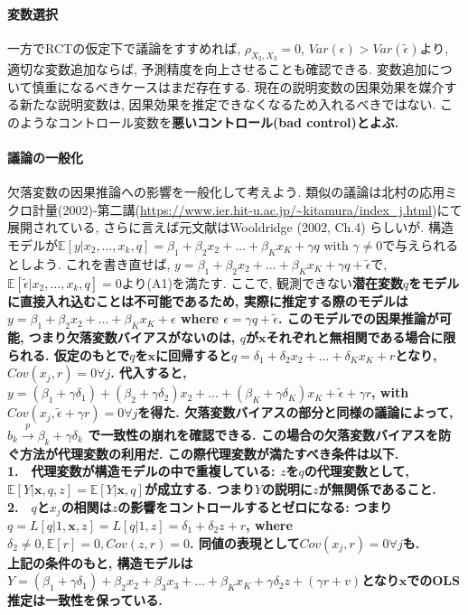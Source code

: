 \documentclass[paper=a4paper,fontsize=10pt]{jlreq}
\begin{document}
\paragraph{変数選択}
一方でRCTの仮定下で議論をすすめれば, $\rho_{X_{2}, X_{3}}=0$, $Var({\epsilon})>Var(\tilde{{\epsilon}})$より, 適切な変数追加ならば, 予測精度を向上させることも確認できる. 変数追加について慎重になるべきケースはまだ存在する. 現在の説明変数の因果効果を媒介する新たな説明変数は, 因果効果を推定できなくなるため入れるべきではない. このようなコントロール変数を\rmfamily\mcfamily\bfseries{悪いコントロール(bad control)}\mdseries とよぶ.\\

\paragraph{議論の一般化}
欠落変数の因果推論への影響を一般化して考えよう. 類似の議論は北村の応用ミクロ計量(2002)-第二講(\url{https://www.ier.hit-u.ac.jp/~kitamura/index_j.html})にて展開されている, さらに言えば元文献はWooldridge (2002, Ch.4) らしいが. 構造モデルが$\mathbb{E}[y|x_2, \dots, x_k, q]=\beta_1+\beta_2x_2+\dots+\beta_Kx_K+\gamma q$ with $\gamma \neq 0$で与えられるとしよう. これを書き直せば, $y=\beta_1+\beta_2x_2+\dots+\beta_Kx_K+\gamma q+\tilde{\epsilon}$で, $\mathbb{E}[\tilde{\epsilon}|x_2, \dots, x_k, q]=0$より(A1)を満たす. ここで, 観測できない\rmfamily\mcfamily\bfseries{潜在変数}\mdseries $q$をモデルに直接入れ込むことは不可能であるため, 実際に推定する際のモデルは$y=\beta_1+\beta_2x_2+\dots+\beta_Kx_K+\epsilon$ where $\epsilon = \gamma q+\tilde{\epsilon}$. このモデルでの因果推論が可能, つまり欠落変数バイアスがないのは, $q$が$\mathbf{x}$それぞれと無相関である場合に限られる. 仮定のもとで$q$を$\mathbf{x}$に回帰すると$q=\delta_1+\delta_2x_2+\dots+\delta_Kx_K+r$となり, $Cov(x_j, r)=0 \forall j$. 代入すると, $y=(\beta_1+\gamma \delta_1)+(\beta_2+\gamma \delta_2)x_2+\dots+(\beta_K+\gamma \delta_K)x_K+\tilde{\epsilon}+\gamma r$, with $Cov(x_j,\tilde{\epsilon}+\gamma r)=0 \forall j$を得た. 欠落変数バイアスの部分と同様の議論によって, $b_k \overset{p}{\to} \beta_k +\gamma \delta_k$ で一致性の崩れを確認できる. この場合の欠落変数バイアスを防ぐ方法が\rmfamily\mcfamily\bfseries{代理変数}\mdseries の利用だ. この際代理変数が満たすべき条件は以下.\\
\rmfamily\mcfamily\bfseries{1.}\mdseries　代理変数が構造モデルの中で重複している: $z$を$q$の代理変数として, $\mathbb{E}[Y|\mathbf{x},q,z]=\mathbb{E}[Y|\mathbf{x},q]$が成立する. つまり$Y$の説明に$z$が無関係であること. \\
\rmfamily\mcfamily\bfseries{2.}\mdseries　$q$と$x_j$の相関は$z$の影響をコントロールするとゼロになる: つまり$q=L[q|1, \mathbf{x}, z]=L[q|1, z]=\delta_1 + \delta_2z+r$, where $\delta_2\neq 0, \mathbb{E}[r]=0, Cov(z, r)=0$. 同値の表現として$Cov(x_j, r)=0 \forall j$も.\\
上記の条件のもと, 構造モデルは$Y=(\beta_1+\gamma\delta_1)+\beta_2x_2+\beta_3x_3+\dots+\beta_Kx_K+\gamma\delta_2z+(\gamma r + v)$となり$\mathbf{x}$でのOLS推定は一致性を保っている.\\
\end{document}
